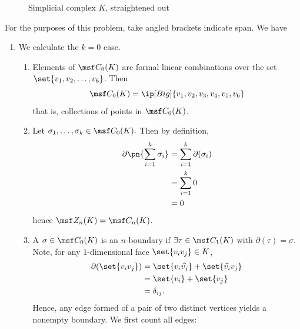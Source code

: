 \begin{solution}
\begin{figure}[H]
    \caption{Simplicial complex $K$, straightened out}
  \end{figure}
  For the purposes of this problem, take angled brackets indicate span. We have
  \begin{enumerate}[label=(\roman*)]
  \item We calculate the $k=0$ case.
    \begin{enumerate}
    \item Elements of $\msf C_0(K)$ are formal linear combinations over the
      set $\set{v_1, v_2, \ldots, v_6}$. Then
      \[
        \msf C_0(K) = \ip[Big]{v_1, v_2, v_3, v_4, v_5, v_6}
      \]
      that is, collections of points in $\msf C_0(K)$.
    \item Let $\sigma_1, \ldots, \sigma_k \in \msf C_0(K).$ Then by definition,
      \begin{align*}
        \partial\pn{\sum_{i=1}^k \sigma_i}
        &= \sum_{i=1}^k \partial(\sigma_i)\\
        &= \sum_{i=1}^k 0 \\
        &= 0
      \end{align*}
      hence $\msf Z_n(K) = \msf C_n(K)$.
    \item A $\sigma \in \msf C_0(K)$ is an $n$-boundary if $\exists \tau \in
      \msf C_{1}(K)$ with $\partial(\tau) = \sigma$. Note, for any
      $1$-dimensional face $\set{v_iv_j} \in K$,
      \begin{align*}
        \partial(\set{v_iv_j})
        &= \set{v_i \widehat{v_j}} + \set{\widehat{v_i}v_j} \\
        &= \set{v_i} + \set{v_j} \\
        &= \delta_{ij}.
      \end{align*}
      Hence, any edge formed of a pair of two distinct vertices yields a
      nonempty boundary. We first count all edges:
      \begin{figure}[H]
        \centering
        \begin{tikzpicture}[
          scale = .6,
          every node/.style={
            circle,
            draw=black,
            fill=white,
            inner sep=0pt,
            minimum size=7pt
          }
          ]


\end{tikzpicture}
\end{figure}
\end{enumerate}
\end{enumerate}
\end{solution}
